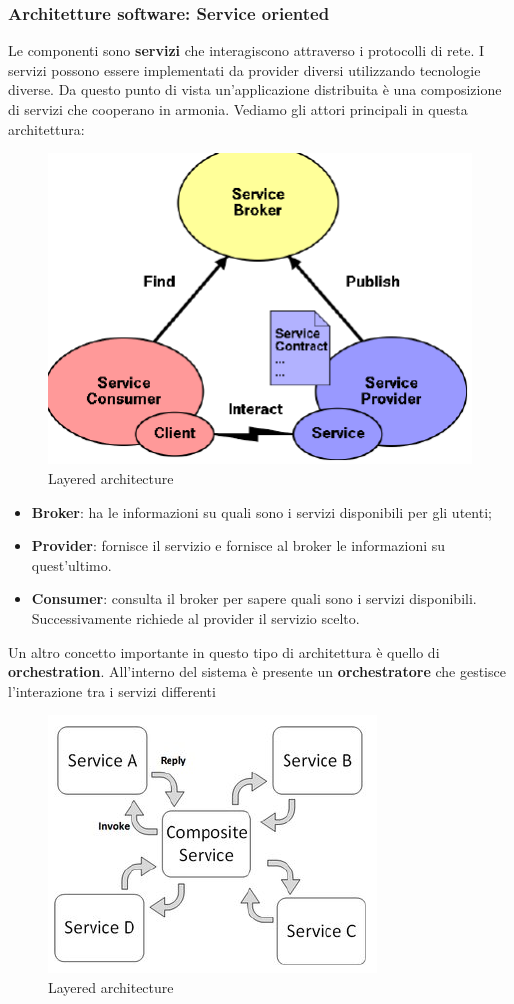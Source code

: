 \documentclass[12pt]{article}
\begin{document}
 	\subsubsection{Architetture software: Service oriented}
 		Le componenti sono \textbf{servizi} che interagiscono attraverso i protocolli di rete. I servizi possono essere implementati da provider diversi utilizzando tecnologie diverse. Da questo punto di vista un'applicazione distribuita è una composizione di servizi che cooperano in armonia. Vediamo gli attori principali in questa architettura:
 		\begin{figure}[h!]
 			\centering
 			\includegraphics[scale=0.40]{img/boh1.png}
 			\caption{Layered architecture}
 		\end{figure}
 		\begin{itemize}
 			\item \textbf{Broker}: ha le informazioni su quali sono i servizi disponibili per gli utenti;
 			\item \textbf{Provider}: fornisce il servizio e fornisce al broker le informazioni su quest'ultimo.
 			\item \textbf{Consumer}: consulta il broker per sapere quali sono i servizi disponibili. Successivamente richiede al provider il servizio scelto.
 		\end{itemize}
 		Un altro concetto importante in questo tipo di architettura è quello di \textbf{orchestration}. All'interno del sistema è presente un \textbf{orchestratore} che gestisce l'interazione tra i servizi differenti
 		\begin{figure}[h!]
 			\centering
 			\includegraphics[scale=0.40]{img/orch.png}
 			\caption{Layered architecture}
 		\end{figure}
\end{document}
